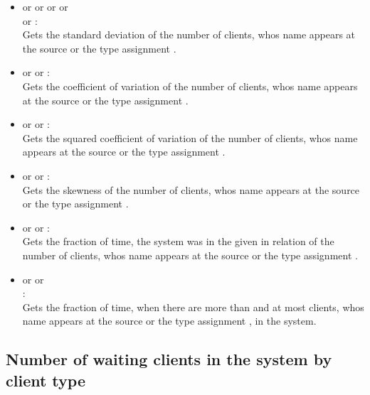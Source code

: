 \begin{itemize}
\item
{} or  or  or  or\\
 or :\\
Gets the standard deviation of the number of clients, whos name appears at the source or the type assignment .

\item
{} or  or :\\
Gets the coefficient of variation of the number of clients, whos name appears at the source or the type assignment .

\item
{} or  or :\\
Gets the squared coefficient of variation of the number of clients, whos name appears at the source or the type assignment .

\item
{} or  or :\\
Gets the skewness of the number of clients, whos name appears at the source or the type assignment .

\item
{} or  or :\\
Gets the fraction of time, the system was in the given  in relation of the number of clients, whos name appears at the source or the type assignment .

\item
{} or  or\\
:\\
Gets the fraction of time, when there are more than  and at most  clients, whos name appears at the source or the type assignment , in the system.

\end{itemize}



\subsection{Number of waiting clients in the system by client type}

